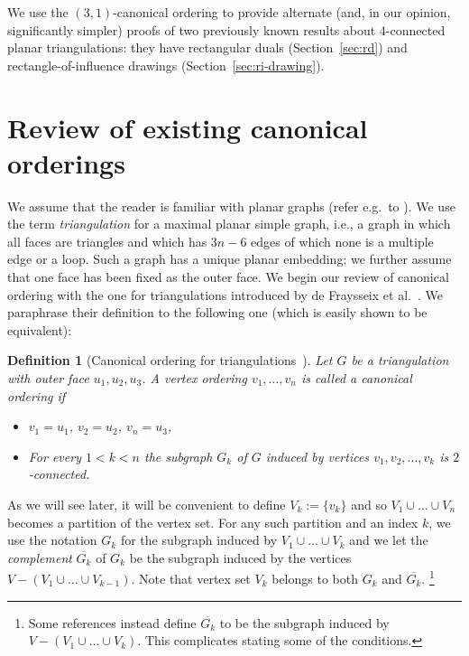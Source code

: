 \documentclass[12pt]{article}
\newtheorem{definition}{Definition}
\begin{document}
We use the $(3,1)$-canonical ordering to provide alternate (and, in our opinion, significantly simpler) proofs of two previously known results about 4-connected planar triangulations: they have rectangular duals (Section~\ref{sec:rd}) and rectangle-of-influence drawings (Section~\ref{sec:ri-drawing}). 


\section{Review of existing canonical orderings}

We assume that the reader is familiar with planar graphs (refer e.g.~to \cite{Die12}).  We use the
term {\em triangulation} for a maximal planar simple graph, i.e., a graph in which all faces
are triangles and which has $3n-6$ edges of which none is a multiple edge or a loop.  Such a graph has a unique planar embedding; we further
assume that one face has been fixed as the outer face.
We begin our review of canonical ordering with the
one for triangulations introduced by de Fraysseix et al.~\cite{FPP90}. 
We paraphrase their definition to the following one (which is easily shown to be equivalent):

\begin{definition}[Canonical ordering for triangulations~\cite{FPP90}]
\label{def:triangulated-co}
Let $G$ be a triangulation with outer face $u_1, u_2, u_3$. A vertex ordering
$v_1,\dots,v_n$ is called a \emph{canonical ordering} if 
\begin{itemize}
\item $v_1=u_1$, $v_2=u_2$, $v_n=u_3$,
\item For every $1 < k < n$
the subgraph $G_{k}$ of $G$ induced by vertices $v_1,v_2, \ldots, v_{k}$ is $2$-connected. 
\end{itemize}
\end{definition}

As we will see later, it will be convenient to define $V_k:=\{v_k\}$ and so $V_1\cup \dots\cup V_n$ becomes a partition
of the vertex set.  For any such partition and an index $k$, we use the notation $G_k$ for the subgraph induced by 
$V_1\cup \dots \cup V_k$ and we let the {\em complement}
$\overline{G_k}$ of $G_k$ be the subgraph induced by the vertices $V-(V_1\cup \dots \cup V_{k-1})$. 
Note that vertex set $V_k$ belongs to both $G_k$ and $\overline{G_k}$.
\footnote{Some references instead define $\overline{G_k}$ to be the subgraph induced by
$V-(V_1\cup \dots \cup V_k)$.  This complicates stating some of the conditions.}  
\end{document}
